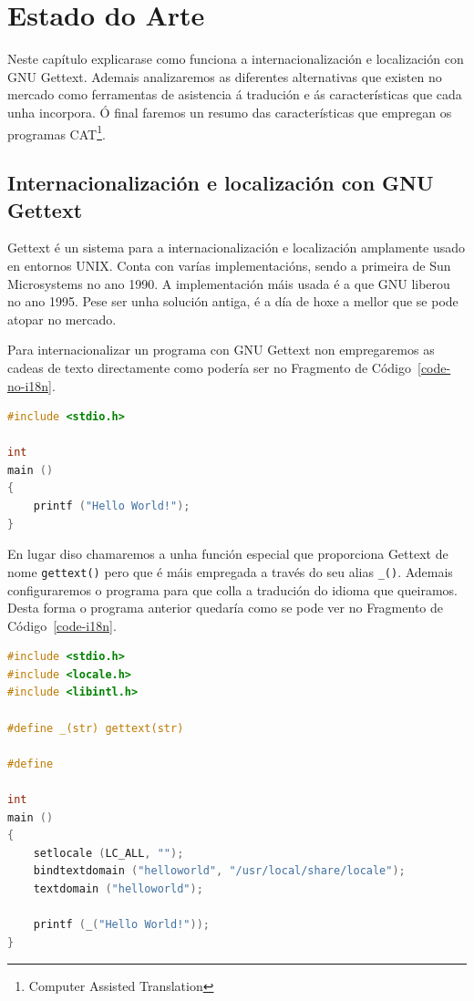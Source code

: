 \chapter{Estado do Arte}

Neste capítulo explicarase como funciona a internacionalización e localización con GNU Gettext. Ademais analizaremos as diferentes alternativas que existen no mercado como ferramentas de asistencia á tradución e ás características que cada unha incorpora. Ó final faremos un resumo das características que empregan os programas CAT\footnote{Computer Assisted Translation}.

\section{Internacionalización e localización con GNU Gettext}
Gettext é un sistema para a internacionalización e localización amplamente usado en entornos UNIX. Conta con varías implementacións, sendo a primeira de Sun Microsystems no ano 1990. A implementación máis usada é a que GNU liberou no ano 1995. Pese ser unha solución antiga, é a día de hoxe a mellor que se pode atopar no mercado.

Para internacionalizar un programa con GNU Gettext non empregaremos as cadeas de texto directamente como podería ser no Fragmento de Código~\ref{code-no-i18n}.

\begin{lstlisting}[language=C,label=code-no-i18n,caption=helloworld.c (Sen Internacionalizar)]
#include <stdio.h>

int
main ()
{
    printf ("Hello World!");
}
\end{lstlisting}

En lugar diso chamaremos a unha función especial que proporciona Gettext de nome \lstinline{gettext()} pero que é máis empregada a través do seu alias \lstinline{_()}. Ademais configuraremos o programa para que colla a tradución do idioma que queiramos. Desta forma o programa anterior quedaría como se pode ver no Fragmento de Código~\ref{code-i18n}.

\begin{lstlisting}[language=C,label=code-i18n,caption=helloworld.c]
#include <stdio.h>
#include <locale.h>
#include <libintl.h>

#define _(str) gettext(str)

#define

int
main ()
{
    setlocale (LC_ALL, "");
    bindtextdomain ("helloworld", "/usr/local/share/locale");
    textdomain ("helloworld");

    printf (_("Hello World!"));
}
\end{lstlisting}

